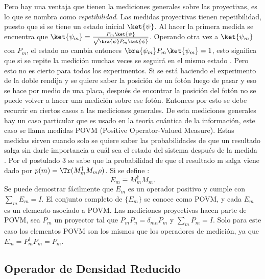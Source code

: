 Pero hay una ventaja que tienen  la mediciones generales sobre las proyectivas, es lo que se nombra como \textit{repetibilidad}. Las medidas proyectivas tienen repetibilidad, puesto que si se tiene un estado inicial $\ket{\psi}$. Al hacer la primera medida se encuentra que $\ket{\psi_{m}}=\frac{P_{m}\ket{\psi}}{\sqrt{\bra{\psi}P_{m}\ket{\psi}}}$. Operando otra vez a $\ket{\psi_{m}}$ con $P_{m}$, el estado no cambia entonces $\bra{\psi_{m}}P_{m}\ket{\psi_{m}}=1$, esto significa que si se repite la medición muchas veces se seguirá en el mismo estado \cite{VedralInformation}. Pero esto no es cierto para todos los experimentos. Si se está haciendo el experimento de la doble rendija y se quiere saber la posición de un fotón luego de pasar y eso se hace por medio de una placa, después de encontrar la posición del fotón no se puede volver a hacer una medición  sobre ese fotón. Entonces por esto se debe recurrir en ciertos casos a las mediciones generales. De esta mediciones generales hay un caso particular que es usado en la teoría cuántica de la información, este caso se llama medidas POVM (Positive Operator-Valued Measure). Estas medidas sirven cuando solo se quiere saber las probabilidades de que un resultado salga sin darle importancia a cuál sea el estado del sistema después de la medida \cite{NielsenInformation}.
Por el postulado 3 se sabe que la probabilidad de que el resultado m salga viene dado por $p(m)= \Tr (M^{\dagger}_{m}M_{m} \rho)$. Si se define :
\begin{equation}
E_{m} \equiv M^{\dagger}_{m}M_{m}.
\end{equation}
Se puede demostrar fácilmente que $E_{m}$ es un operador positivo y cumple con $\sum_{m} E_{m}=I$. El conjunto completo de $ \{ E_{m}\}$ se conoce como POVM, y cada $E_{m}$ es un elemento asociado a POVM. Las mediciones proyectivas hacen parte de POVM, sea $P_{m}$ un proyector tal que $P_{m}P_{n}= \delta_{mn}P_{m}$ y $\sum_{m}P_{m}=I$. Solo para este caso los elementos POVM son los mismos que los operadores de medición, ya que $E_{m}=P_{m}^{\dagger}P_{m}=P_{m}$.

\subsection{Operador de Densidad Reducido}

